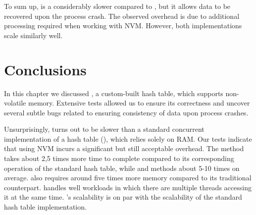     To sum up, \PHT is a considerably slower compared to \StandardHashMap, but it allows data to be recovered upon the process crash. The observed overhead is due to additional processing required when working with NVM. 
    However, both implementations scale similarly well. 
            
\section{Conclusions}
        
    In this chapter we discussed \PHT, a custom-built hash table, which supports non-volatile memory. 
    Extensive tests allowed us to ensure its correctness and uncover several subtle bugs related to ensuring consistency of data upon process crashes.
    
    Unsurprisingly, \PHT turns out to be slower than a standard concurrent implementation of a hash table (\StandardHashMap), which relies solely on RAM. Our tests indicate that using NVM incurs a significant but still acceptable overhead.
    The \getMethod method takes about 2,5 times more time to complete compared to its corresponding operation of the standard hash table, while \insertMethod and \removeMethod methods about 5-10 times on average. \PHT also requires around five times more memory compared to its traditional counterpart. \PHT handles well workloads in which there are multiple threads accessing it at the same time. \PHT's scalability is on par with the scalability of the standard hash table implementation.
    
